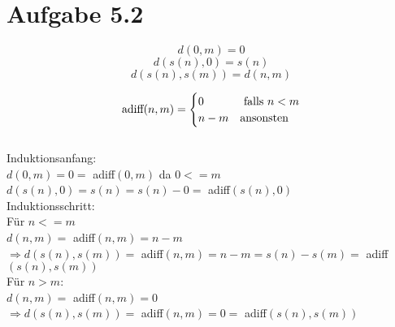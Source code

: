 \section*{Aufgabe 5.2}
\[d(0,m)=0\]
\[d(s(n),0)=s(n)\]
\[d(s(n),s(m))=d(n,m)\]

\[\text{adiff}(n,m)=\begin{cases}
0&$ falls $ n<m\\
n-m& $ansonsten$
\end{cases}\]
\\
Induktionsanfang: \\
$d(0,m)=0=$ adiff$(0,m)$ da $0<=m$\\
$d(s(n),0)=s(n)=s(n)-0=$ adiff$(s(n),0)$\\
Induktionsschritt:\\
Für $n<=m$\\
$d(n,m)=$ adiff$(n,m)=n-m$\\
$\Rightarrow d(s(n),s(m))=$ adiff$(n,m)=n-m=s(n)-s(m)=$ adiff$(s(n),s(m))$\\
Für $n>m$:\\
$d(n,m)=$ adiff$(n,m)=0$\\
$\Rightarrow d(s(n),s(m))=$ adiff$(n,m)=0=$ adiff$(s(n),s(m))$\\
